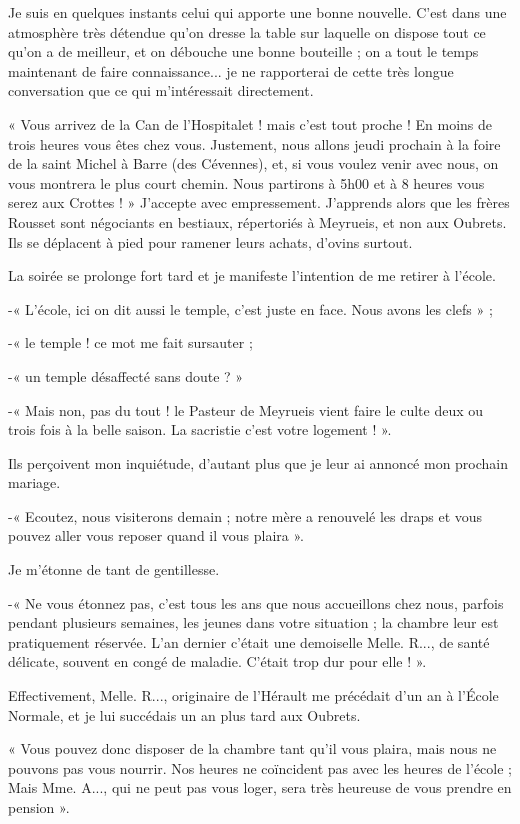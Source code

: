 Je suis en quelques instants celui qui apporte une bonne nouvelle. C'est dans une
atmosphère très détendue qu'on dresse la table sur laquelle on dispose tout ce qu'on a
de meilleur, et on débouche une bonne bouteille ; on a tout le temps maintenant de
faire connaissance... je ne rapporterai de cette très longue conversation que ce qui
m'intéressait directement.

« Vous arrivez de la Can de l'Hospitalet ! mais c'est tout proche ! En moins de trois
heures vous êtes chez vous. Justement, nous allons jeudi prochain à la foire de la saint
Michel à Barre (des Cévennes), et, si vous voulez venir avec nous, on vous montrera
le plus court chemin. Nous partirons à 5h00 et à 8 heures vous serez aux Crottes ! »
J'accepte avec empressement. J'apprends alors que les frères Rousset sont négociants
en bestiaux, répertoriés à Meyrueis, et non aux Oubrets. Ils se déplacent à pied pour
ramener leurs achats, d'ovins surtout.

La soirée se prolonge fort tard et je manifeste l'intention de me retirer à l'école.

-« L'école, ici on dit aussi le temple, c'est juste en face. Nous avons les clefs » ;

-« le temple ! ce mot me fait sursauter ;

-« un temple désaffecté sans doute ? »

-« Mais non, pas du tout ! le Pasteur de Meyrueis vient faire le culte deux ou trois
fois à la belle saison. La sacristie c'est votre logement ! ».

Ils perçoivent mon inquiétude, d'autant plus que je leur ai annoncé mon prochain
mariage.

-« Ecoutez, nous visiterons demain ; notre mère a renouvelé les draps et vous
pouvez aller vous reposer quand il vous plaira ».

Je m'étonne de tant de gentillesse.

-« Ne vous étonnez pas, c'est tous les ans que nous accueillons chez nous, parfois
pendant plusieurs semaines, les jeunes dans votre situation ; la chambre leur est
pratiquement réservée. L'an dernier c'était une demoiselle Melle. R..., de santé
délicate, souvent en congé de maladie. C'était trop dur pour elle ! ».

Effectivement, Melle. R..., originaire de l'Hérault me précédait d'un an à l'École
Normale, et je lui succédais un an plus tard aux Oubrets.

« Vous pouvez donc disposer de la chambre tant qu'il vous plaira, mais nous ne
pouvons pas vous nourrir. Nos heures ne coïncident pas avec les heures de l'école ;
Mais Mme. A..., qui ne peut pas vous loger, sera très heureuse de vous prendre en
pension ».

